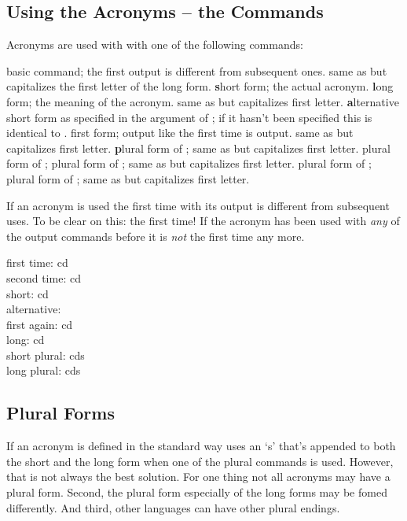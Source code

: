 \documentclass[DIV10,toc=index,toc=bib]{cnpkgdoc}
\newcommand*\h[1]{\textcolor{main}{\textbf{#1}}}
\begin{document}
\subsection{Using the Acronyms -- the Commands}
Acronyms are used with with one of the following commands:
\begin{beschreibung}
  basic command; the first output is different from subsequent ones.
  same as  but capitalizes the first letter of the long form.
  \h{s}hort form; the actual acronym.
  \h{l}ong form; the meaning of the acronym.
  same as  but capitalizes first letter.
  \h{a}lternative short form as specified in the  argument
 of ; if it hasn't been specified this is identical to .
  first form; output like the first time  is output.
  same as  but capitalizes first letter.
  \h{p}lural form of ;
  same as  but capitalizes first letter.
  plural form of ;
  plural form of ;
  same as  but capitalizes first letter.
  plural form of ;
  plural form of ;
  same as  but capitalizes first letter.
\end{beschreibung}
If an acronym is used the first time with  its output is different from
subsequent uses. To be clear on this: the first time! If the acronym has been
used with \emph{any} of the output commands before it is \emph{not} the first
time any more.

\begin{beispiel}
 first time: \ac{cd} \\
 second time: \ac{cd} \\
 short: \acs{cd} \\
 alternative:  \\
 first again: \acf{cd} \\
 long: \acl{cd} \\
 short plural: \acsp{cd} \\
 long plural: \aclp{cd}
\end{beispiel}

\subsection{Plural Forms}
If an acronym is defined in the standard way \acro uses an `s' that's appended to
both the short and the long form when one of the plural commands is used. However,
that is not always the best solution. For one thing not all acronyms may have a
plural form. Second, the plural form especially of the long forms may be fomed
differently. And third, other languages can have other plural endings.
\end{document}
